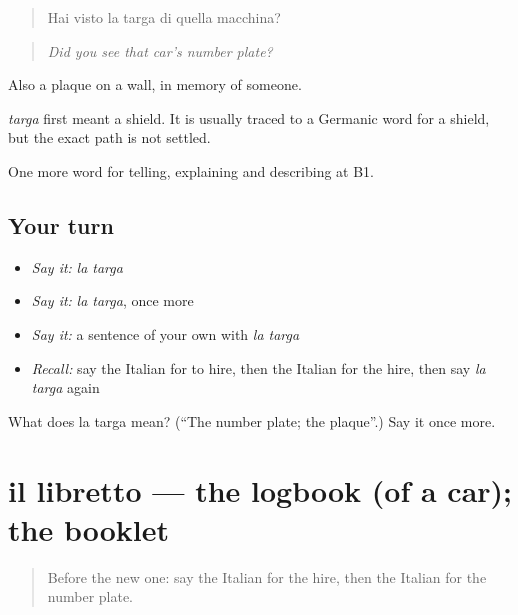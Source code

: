\begin{quote}
Hai visto la targa di quella macchina?
\end{quote}

\begin{quote}
\emph{Did you see that car's number plate?}
\end{quote}

Also a plaque on a wall, in memory of someone.

\begin{cousinweb}
\emph{targa} first meant a shield. It is usually traced to a Germanic word for a shield, but the exact path is not settled.
\end{cousinweb}

\begin{grammarlens}[title={What you've built}]
One more word for telling, explaining and describing at B1.
\end{grammarlens}

\subsection*{Your turn}
\begin{itemize}
\raggedright
  \item \emph{Say it:} \emph{la targa}
  \item \emph{Say it:} \emph{la targa}, once more
  \item \emph{Say it:} a sentence of your own with \emph{la targa}
  \item \emph{Recall:} say the Italian for to hire, then the Italian for the hire, then say \emph{la targa} again
\end{itemize}

\begin{tcolorbox}[breakable,colback=teal!4,colframe=teal!35!black,title={Before you move on}]
What does la targa mean? (\textquotedblleft{}The number plate; the plaque\textquotedblright{}.) Say it once more.
\end{tcolorbox}
\section[il libretto]{il libretto — the logbook (of a car); the booklet}

\label{lesson:IT-C415-libretto}



\begin{quote}
Before the new one: say the Italian for the hire, then the Italian for the number plate.
\end{quote}

